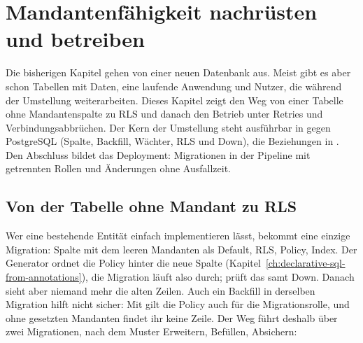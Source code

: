 \chapter{Mandantenfähigkeit nachrüsten und betreiben}\label{ch:retrofitting-and-operating}

Die bisherigen Kapitel gehen von einer neuen Datenbank aus. Meist gibt es aber schon Tabellen
mit Daten, eine laufende Anwendung und Nutzer, die während der Umstellung weiterarbeiten. Dieses
Kapitel zeigt den Weg von einer Tabelle ohne Mandantenspalte zu RLS und danach den Betrieb unter
Retries und Verbindungsabbrüchen. Der Kern der Umstellung steht ausführbar
in  gegen PostgreSQL (Spalte, Backfill, Wächter, RLS und
Down), die Beziehungen in . Den Abschluss bildet das Deployment:
Migrationen in der Pipeline mit getrennten Rollen und Änderungen ohne Ausfallzeit.

\section{Von der Tabelle ohne Mandant zu RLS}

Wer eine bestehende Entität einfach  implementieren lässt,
bekommt eine einzige Migration: Spalte mit dem leeren Mandanten als Default, RLS, Policy, Index.
Der Generator ordnet die Policy hinter die neue Spalte
(Kapitel~\ref{ch:declarative-sql-from-annotations}), die Migration läuft also durch;
 prüft das samt Down. Danach sieht aber
niemand mehr die alten Zeilen. Auch ein Backfill in derselben Migration hilft nicht
sicher: Mit  gilt die Policy auch für die Migrationsrolle, und
ohne gesetzten Mandanten findet ihr  keine Zeile. Der Weg führt deshalb über zwei
Migrationen, nach dem Muster Erweitern, Befüllen, Absichern:


